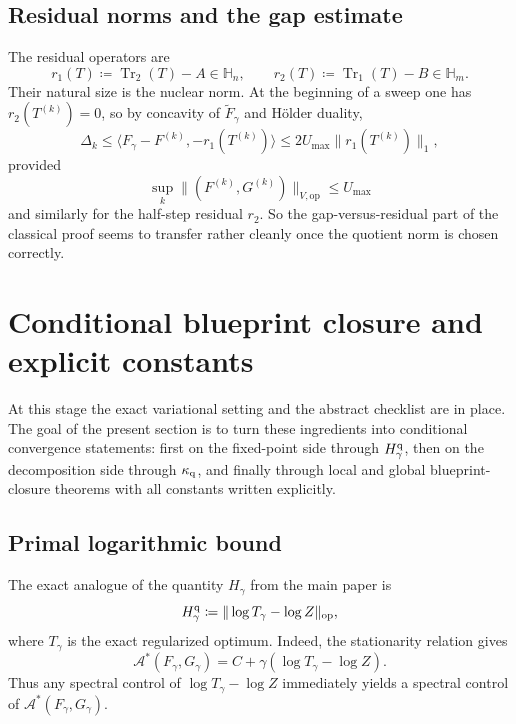 \documentclass[11pt]{article}
\newcommand{\Trone}{\operatorname{Tr}_{1}}
\newcommand{\Trtwo}{\operatorname{Tr}_{2}}
\newcommand{\eqdef}{\coloneqq}
\newcommand{\dotp}[2]{\langle #1,#2\rangle}
\newcommand{\Hh}{\mathbb{H}}
\newcommand{\Aa}{\mathcal{A}}
\newcommand{\Ee}{\widetilde F}
\newcommand{\op}{\mathrm{op}}
\theoremstyle{plain}
\begin{document}
\subsection{Residual norms and the gap estimate}

The residual operators are
\[
r_1(T)\eqdef \Trtwo(T)-A \in \Hh_n,
\qquad
r_2(T)\eqdef \Trone(T)-B \in \Hh_m.
\]
Their natural size is the nuclear norm.
At the beginning of a sweep one has $r_2(T^{(k)})=0$, so by concavity of $\Ee_\gamma$ and Hölder duality,
\[
\Delta_k
\le
\dotp{F_\gamma-F^{(k)}}{-r_1(T^{(k)})}
\le
2 U_{\max} \|r_1(T^{(k)})\|_1,
\]
provided
\[
\sup_k \|(F^{(k)},G^{(k)})\|_{V,\op} \le U_{\max}
\]
and similarly for the half-step residual $r_2$.
So the gap-versus-residual part of the classical proof seems to transfer rather cleanly once the quotient norm is chosen correctly.

\section{Conditional blueprint closure and explicit constants}

At this stage the exact variational setting and the abstract checklist are in place. The goal of the present section is to turn these ingredients into conditional convergence statements: first on the fixed-point side through $H_\gamma^{\rm q}$, then on the decomposition side through $\kappa_{\rm q}$, and finally through local and global blueprint-closure theorems with all constants written explicitly.

\subsection{Primal logarithmic bound}

The exact analogue of the quantity $H_\gamma$ from the main paper is
\begin{equation}
\label{eq:quantum-Hgamma}
H_\gamma^{\rm q}
\eqdef
\|\log T_\gamma - \log Z\|_{\op},
\end{equation}
where $T_\gamma$ is the exact regularized optimum.
Indeed, the stationarity relation gives
\begin{equation}
\label{eq:stationarity-quantum}
\Aa^\ast(F_\gamma,G_\gamma)
=
C + \gamma(\log T_\gamma-\log Z).
\end{equation}
Thus any spectral control of $\log T_\gamma-\log Z$ immediately yields a spectral control of $\Aa^\ast(F_\gamma,G_\gamma)$.
\end{document}
